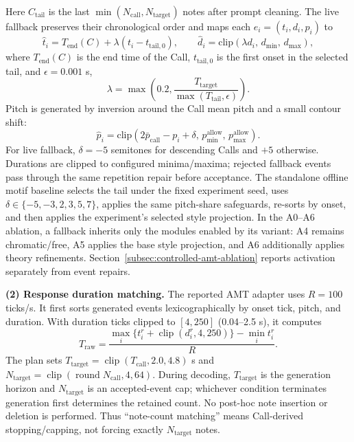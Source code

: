 \documentclass[11pt,a4paper]{article}
\begin{document}
Here $C_{\mathrm{tail}}$ is the last $\min(N_{\mathrm{call}},N_{\mathrm{target}})$ notes after prompt cleaning. The live fallback preserves their chronological order and maps each $e_i=(t_i,d_i,p_i)$ to
\begin{equation}
\hat{t}_i
=
T_{\mathrm{end}}(C)
+
\lambda
\left(
t_i - t_{\mathrm{tail},0}
\right),
\qquad
\hat{d}_i
=
\mathrm{clip}
\left(
\lambda d_i,\,
d_{\min},\,
d_{\max}
\right),
\label{eq:fallback-time-rule}
\end{equation}
where $T_{\mathrm{end}}(C)$ is the end time of the Call, $t_{\mathrm{tail},0}$ is the first onset in the selected tail, and $\epsilon=0.001$ s,
\begin{equation}
\lambda =
\max\left(0.2,\frac{T_{\mathrm{target}}}
{\max(T_{\mathrm{tail}}, \epsilon)}\right).
\label{eq:fallback-scale}
\end{equation}
Pitch is generated by inversion around the Call mean pitch and a small contour shift:
\begin{equation}
\hat{p}_i
=
\mathrm{clip}
\left(
2\bar{p}_{\mathrm{call}} - p_i + \delta,\,
p_{\min}^{\mathrm{allow}},\,
p_{\max}^{\mathrm{allow}}
\right).
\label{eq:fallback-pitch-rule}
\end{equation}
For live fallback, $\delta=-5$ semitones for descending Calls and $+5$ otherwise. Durations are clipped to configured minima/maxima; rejected fallback events pass through the same repetition repair before acceptance. The standalone offline motif baseline selects the tail under the fixed experiment seed, uses $\delta\in\{-5,-3,2,3,5,7\}$, applies the same pitch-share safeguards, re-sorts by onset, and then applies the experiment's selected style projection. In the A0--A6 ablation, a fallback inherits only the modules enabled by its variant: A4 remains chromatic/free, A5 applies the base style projection, and A6 additionally applies theory refinements. Section~\ref{subsec:controlled-amt-ablation} reports activation separately from event repairs.

\noindent\textbf{(2) Response duration matching.}
The reported AMT adapter uses $R=100$ ticks/s. It first sorts generated events lexicographically by onset tick, pitch, and duration. With duration ticks clipped to $[4,250]$ (0.04--2.5 s), it computes
\begin{equation}
T_{\mathrm{raw}} = \frac{\max_i\{t_i^r+\operatorname{clip}(d_i^r,4,250)\}-\min_i t_i^r}{R}.
\label{eq:raw-response-duration}
\end{equation}
The plan sets $T_{\mathrm{target}}=\operatorname{clip}(T_{\mathrm{call}},2.0,4.8)$ s and $N_{\mathrm{target}}=\operatorname{clip}(\operatorname{round}N_{\mathrm{call}},4,64)$. During decoding, $T_{\mathrm{target}}$ is the generation horizon and $N_{\mathrm{target}}$ is an accepted-event cap; whichever condition terminates generation first determines the retained count. No post-hoc note insertion or deletion is performed. Thus ``note-count matching'' means Call-derived stopping/capping, not forcing exactly $N_{\mathrm{target}}$ notes.
\end{document}
